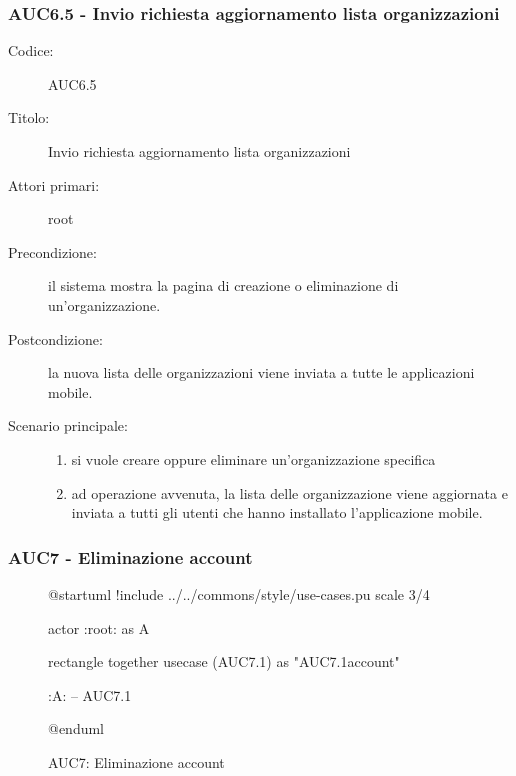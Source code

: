 \documentclass[casi-duso]{subfiles}
\begin{document}
\subsubsection{AUC6.5 - Invio richiesta aggiornamento lista organizzazioni}%
\label{subsub:AUC6.5}
\begin{description}
  \item[Codice:] AUC6.5
  \item[Titolo:] Invio richiesta aggiornamento lista organizzazioni
  \item[Attori primari:] root
  \item[Precondizione:] il sistema mostra la pagina di creazione o eliminazione di un'organizzazione.
  \item[Postcondizione:] la nuova lista delle organizzazioni viene inviata a tutte le applicazioni mobile.
  \item[Scenario principale:]
  \begin{enumerate}
    \item si vuole creare oppure eliminare un'organizzazione specifica
    \item ad operazione avvenuta, la lista delle organizzazione viene aggiornata e inviata a tutti gli utenti che hanno installato l'applicazione mobile.
  \end{enumerate}
\end{description}

\subsubsection{AUC7 - Eliminazione account}%
\label{subsub:AUC7}

\begin{figure}[h!]
  \centering
  \begin{plantuml}
  @startuml
  !include ../../commons/style/use-cases.pu
  scale 3/4

  actor :root: as A

  rectangle {
    together {
      usecase (AUC7.1) as "AUC7.1\nSeleziona account"
    }
  }

  :A: -- AUC7.1

  @enduml
  \end{plantuml}
  \caption{AUC7: Eliminazione account}
  \label{fig:auc7}
\end{figure}
\end{document}
